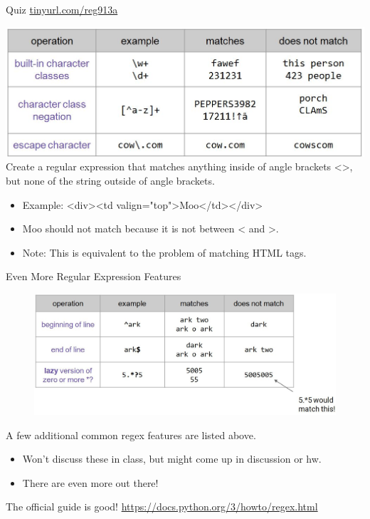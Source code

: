 \documentclass[aspectratio=169]{../latex_main/tntbeamer}  %
\begin{document}
	
	
	\begin{frame}{Quiz \url{tinyurl.com/reg913a}}
	 
	    \includegraphics[scale=.43]{Bild16}\\
	    Create a regular expression that matches anything inside of angle brackets <>, but none of the string outside of angle brackets.
        \begin{itemize}
            \item Example: <div><td valign="top">Moo</td></div>
            \item Moo should not match because it is not between < and >.
            \item Note: This is equivalent to the problem of matching HTML tags.
        \end{itemize}

	\end{frame}
	
	
	
	\begin{frame}{Even More Regular Expression Features}
	    \begin{figure}
	        \centering
	        \includegraphics[scale=.35]{Bild18}
	    \end{figure}
	    A few additional common regex features are listed above.
        \begin{itemize}
            \item Won’t discuss these in class, but might come up in discussion or hw.
            \item There are even more out there!
        \end{itemize}
        The official guide is good! \url{https://docs.python.org/3/howto/regex.html}
	\end{frame}
\end{document}

